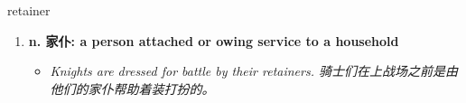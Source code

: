 
\begin{frame}
{\huge retainer}
\begin{center}
\begin{enumerate}\Large
  \item \textbf{n. 家仆: a person attached or owing service to a household}
  \begin{itemize}
    \item \em{\Large{Knights are dressed for battle by their retainers. 骑士们在上战场之前是由他们的家仆帮助着装打扮的。}}
  \end{itemize}
\end{enumerate}
\end{center}
\end{frame}
